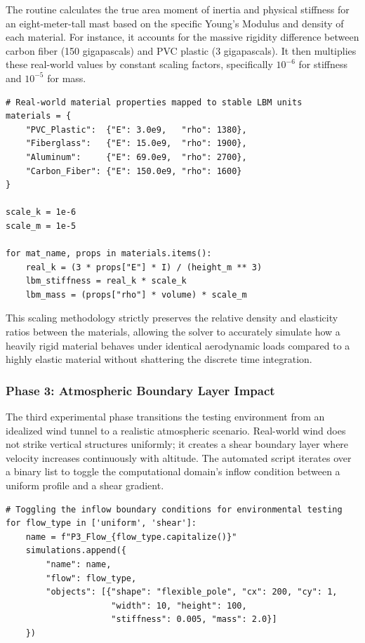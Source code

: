 \documentclass[11pt,a4paper]{article}
\begin{document}
The routine calculates the true area moment of inertia and physical stiffness for an eight-meter-tall mast based on the specific Young's Modulus and density of each material. For instance, it accounts for the massive rigidity difference between carbon fiber (150 gigapascals) and PVC plastic (3 gigapascals). It then multiplies these real-world values by constant scaling factors, specifically $10^{-6}$ for stiffness and $10^{-5}$ for mass.

\begin{lstlisting}[style=pystyle]
# Real-world material properties mapped to stable LBM units
materials = {
    "PVC_Plastic":  {"E": 3.0e9,   "rho": 1380},
    "Fiberglass":   {"E": 15.0e9,  "rho": 1900},
    "Aluminum":     {"E": 69.0e9,  "rho": 2700},
    "Carbon_Fiber": {"E": 150.0e9, "rho": 1600}
}

scale_k = 1e-6
scale_m = 1e-5

for mat_name, props in materials.items():
    real_k = (3 * props["E"] * I) / (height_m ** 3)
    lbm_stiffness = real_k * scale_k
    lbm_mass = (props["rho"] * volume) * scale_m
\end{lstlisting}

This scaling methodology strictly preserves the relative density and elasticity ratios between the materials, allowing the solver to accurately simulate how a heavily rigid material behaves under identical aerodynamic loads compared to a highly elastic material without shattering the discrete time integration.

\subsubsection{Phase 3: Atmospheric Boundary Layer Impact}
The third experimental phase transitions the testing environment from an idealized wind tunnel to a realistic atmospheric scenario. Real-world wind does not strike vertical structures uniformly; it creates a shear boundary layer where velocity increases continuously with altitude. The automated script iterates over a binary list to toggle the computational domain's inflow condition between a uniform profile and a shear gradient. 

\begin{lstlisting}[style=pystyle]
# Toggling the inflow boundary conditions for environmental testing
for flow_type in ['uniform', 'shear']:
    name = f"P3_Flow_{flow_type.capitalize()}"
    simulations.append({
        "name": name,
        "flow": flow_type,
        "objects": [{"shape": "flexible_pole", "cx": 200, "cy": 1, 
                     "width": 10, "height": 100, 
                     "stiffness": 0.005, "mass": 2.0}]
    })
\end{lstlisting}
\end{document}
